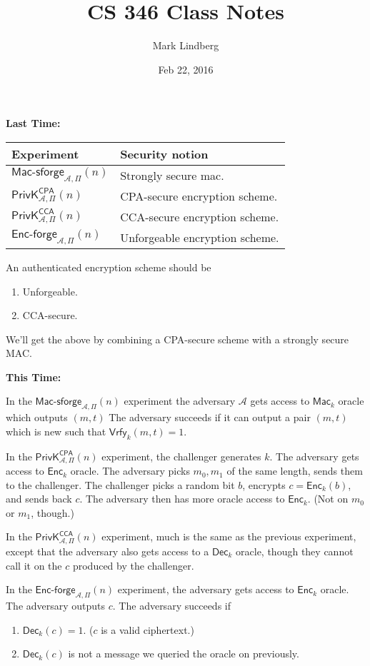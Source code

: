 \documentclass[12pt]{article}
\newcommand{\AAA}{\mathcal{A}}
\newcommand{\Enc}{\mathsf{Enc}}
\newcommand{\Dec}{\mathsf{Dec}}
\newcommand{\Mac}{\mathsf{Mac}}
\newcommand{\Macsf}{\mathsf{Mac\text{-}sforge}}
\newcommand{\Encf}{\mathsf{Enc\text{-}forge}}
\newcommand{\Vrfy}{\mathsf{Vrfy}}
\newcommand{\ExptCcaArgs}[2]{\mathsf{PrivK}^{\mathsf{CCA}}_{#1,#2}}
\newcommand{\ExptCpaArgs}[2]{\mathsf{PrivK}^{\mathsf{CPA}}_{#1,#2}}
\newcommand{\ExptCca}{\ExptCcaArgs{\AAA}{\Pi}}
\newcommand{\ExptCpa}{\ExptCpaArgs{\AAA}{\Pi}}
\begin{document}
\title{CS 346 Class Notes}
\date{Feb 22, 2016}
\author{Mark Lindberg}
\maketitle
\thispagestyle{fancy}

{\bf Last Time:}
\begin{tabular}{| l | l |}
\hline
Experiment & Security notion\\\hline
$\Macsf_{\AAA,\Pi}(n)$ & Strongly secure mac.\\\hline
$\ExptCpa(n)$ & CPA-secure encryption scheme.\\\hline
$\ExptCca(n)$ & CCA-secure encryption scheme.\\\hline
$\Encf_{\AAA,\Pi}(n)$ & Unforgeable encryption scheme.\\\hline
\end{tabular}

An authenticated encryption scheme should be\begin{enumerate}

\item Unforgeable.

\item CCA-secure.

\end{enumerate}

We'll get the above by combining a CPA-secure scheme with a strongly secure MAC.

{\bf This Time:}

In the $\Macsf_{\AAA,\Pi}(n)$ experiment the adversary $\AAA$ gets access to $\Mac_k$ oracle which outputs $(m,t)$ The adversary succeeds if it can output a pair $(m,t)$ which is new such that $\Vrfy_k(m,t)=1$.

In the $\ExptCpa(n)$ experiment, the challenger generates $k$. The adversary gets access to $\Enc_k$ oracle. The adversary picks $m_0,m_1$ of the same length, sends them to the challenger. The challenger picks a random bit $b$, encrypts $c=\Enc_k(b)$, and sends back $c$. The adversary then has more oracle access to $\Enc_k$. (Not on $m_0$ or $m_1$, though.)

In the $\ExptCca(n)$ experiment, much is the same as the previous experiment, except that the adversary also gets access to a $\Dec_k$ oracle, though they cannot call it on the $c$ produced by the challenger.

In the $\Encf_{\AAA,\Pi}(n)$ experiment, the adversary gets access to $\Enc_k$ oracle. The adversary outputs $c$. The adversary succeeds if\begin{enumerate}

\item $\Dec_k(c)=1$. ($c$ is a valid ciphertext.)

\item $\Dec_k(c)$ is not a message we queried the oracle on previously.

\end{enumerate}
\end{document}
